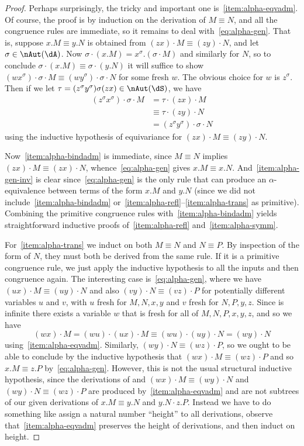 \documentclass{book}
\begin{document}
\begin{proof}
  Perhaps surprisingly, the tricky and important one is~\ref{item:alpha-eqvadm}.
  Of course, the proof is by induction on the derivation of $M\equiv N$, and all the congruence rules are immediate, so it remains to deal with~\eqref{eq:alpha-gen}.
  That is, suppose $x.M\equiv y.N$ is obtained from $(zx)\cdot M \equiv (zy)\cdot N$, and let $\sigma\in\nAut(\dA)$.
  Now $\sigma\cdot(x.M) = x^\sigma.(\sigma\cdot M)$ and similarly for $N$, so to conclude $\sigma\cdot(x.M) \equiv \sigma\cdot(y.N)$ it will suffice to show $(wx^\sigma)\cdot \sigma\cdot M \equiv (wy^\sigma)\cdot\sigma\cdot N$ for some fresh $w$.
  The obvious choice for $w$ is $z^\sigma$.
  Then if we let $\tau = (z^\sigma y^\sigma)\sigma(zx)\in\nAut(\dS)$, we have
  \begin{align*}
    (z^\sigma x^\sigma)\cdot \sigma\cdot M
    &= \tau \cdot (zx)\cdot M\\
    &\equiv \tau \cdot (zy)\cdot N\\
    &= (z^\sigma y^\sigma)\cdot\sigma\cdot N
  \end{align*}
  using the inductive hypothesis of equivariance for $(zx)\cdot M \equiv (zy)\cdot N$.

  Now~\ref{item:alpha-bindadm} is immediate, since $M\equiv N$ implies $(zx)\cdot M \equiv (zx)\cdot N$, whence~\eqref{eq:alpha-gen} gives $x.M\equiv x.N$.
  And~\ref{item:alpha-gen-inv} is clear since~\eqref{eq:alpha-gen} is the only rule that can produce an $\alpha$-equivalence between terms of the form $x.M$ and $y.N$ (since we did not include~\ref{item:alpha-bindadm} or~\ref{item:alpha-refl}--\ref{item:alpha-trans} as primitive).
  Combining the primitive congruence rules with~\ref{item:alpha-bindadm} yields straightforward inductive proofs of~\ref{item:alpha-refl} and~\ref{item:alpha-symm}.

  For~\ref{item:alpha-trans} we induct on both $M\equiv N$ and $N\equiv P$.
  By inspection of the form of $N$, they must both be derived from the same rule.
  If it is a primitive congruence rule, we just apply the inductive hypothesis to all the inputs and then congruence again.
  The interesting case is~\eqref{eq:alpha-gen}, where we have $(ux)\cdot M \equiv (uy)\cdot N$ and also $(vy)\cdot N\equiv (vz)\cdot P$ for potentially different variables $u$ and $v$, with $u$ fresh for $M,N,x,y$ and $v$ fresh for $N,P,y,z$.
  Since \dA is infinite there exists a variable $w$ that is fresh for all of $M,N,P,x,y,z$, and so we have
  \[ (wx)\cdot M = (wu)\cdot (ux)\cdot M \equiv (wu)\cdot (uy)\cdot N = (wy)\cdot N\]
  using~\ref{item:alpha-eqvadm}.
  Similarly, $(wy)\cdot N \equiv (wz)\cdot P$, so we ought to be able to conclude by the inductive hypothesis that $(wx)\cdot M\equiv (wz)\cdot P$ and so $x.M\equiv z.P$ by~\eqref{eq:alpha-gen}.
  However, this is not the usual structural inductive hypothesis, since the derivations of and $(wx)\cdot M \equiv (wy)\cdot N $ and $(wy)\cdot N \equiv (wz)\cdot P$ are produced by~\ref{item:alpha-eqvadm} and are not subtrees of our given derivations of $x.M\equiv y.N$ and $y.N\cdot z.P$.
  Instead we have to do something like assign a natural number ``height'' to all derivations, observe that~\ref{item:alpha-eqvadm} preserves the height of derivations, and then induct on height.


\end{proof}
\end{document}
